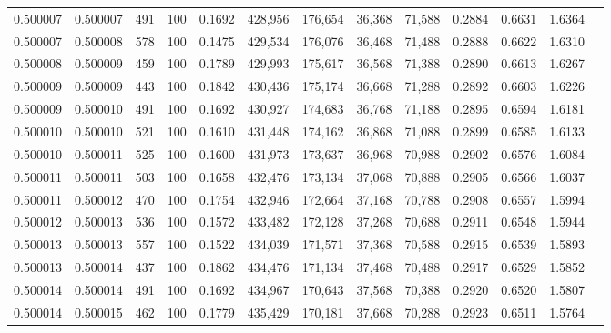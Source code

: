 \begin{tabular}{rrrrrrrrrrrrr}
0.500007 & 0.500007 &   491 & 100 &                                     0.1692 & 428,956 & 176,654 &  36,368 &  71,588 & 0.2884 & 0.6631 & 1.6364 \\
0.500007 & 0.500008 &   578 & 100 &                                     0.1475 & 429,534 & 176,076 &  36,468 &  71,488 & 0.2888 & 0.6622 & 1.6310 \\
0.500008 & 0.500009 &   459 & 100 &                                     0.1789 & 429,993 & 175,617 &  36,568 &  71,388 & 0.2890 & 0.6613 & 1.6267 \\
0.500009 & 0.500009 &   443 & 100 &                                     0.1842 & 430,436 & 175,174 &  36,668 &  71,288 & 0.2892 & 0.6603 & 1.6226 \\
0.500009 & 0.500010 &   491 & 100 &                                     0.1692 & 430,927 & 174,683 &  36,768 &  71,188 & 0.2895 & 0.6594 & 1.6181 \\
0.500010 & 0.500010 &   521 & 100 &                                     0.1610 & 431,448 & 174,162 &  36,868 &  71,088 & 0.2899 & 0.6585 & 1.6133 \\
0.500010 & 0.500011 &   525 & 100 &                                     0.1600 & 431,973 & 173,637 &  36,968 &  70,988 & 0.2902 & 0.6576 & 1.6084 \\
0.500011 & 0.500011 &   503 & 100 &                                     0.1658 & 432,476 & 173,134 &  37,068 &  70,888 & 0.2905 & 0.6566 & 1.6037 \\
0.500011 & 0.500012 &   470 & 100 &                                     0.1754 & 432,946 & 172,664 &  37,168 &  70,788 & 0.2908 & 0.6557 & 1.5994 \\
0.500012 & 0.500013 &   536 & 100 &                                     0.1572 & 433,482 & 172,128 &  37,268 &  70,688 & 0.2911 & 0.6548 & 1.5944 \\
0.500013 & 0.500013 &   557 & 100 &                                     0.1522 & 434,039 & 171,571 &  37,368 &  70,588 & 0.2915 & 0.6539 & 1.5893 \\
0.500013 & 0.500014 &   437 & 100 &                                     0.1862 & 434,476 & 171,134 &  37,468 &  70,488 & 0.2917 & 0.6529 & 1.5852 \\
0.500014 & 0.500014 &   491 & 100 &                                     0.1692 & 434,967 & 170,643 &  37,568 &  70,388 & 0.2920 & 0.6520 & 1.5807 \\
0.500014 & 0.500015 &   462 & 100 &                                     0.1779 & 435,429 & 170,181 &  37,668 &  70,288 & 0.2923 & 0.6511 & 1.5764 \\

\end{tabular}
